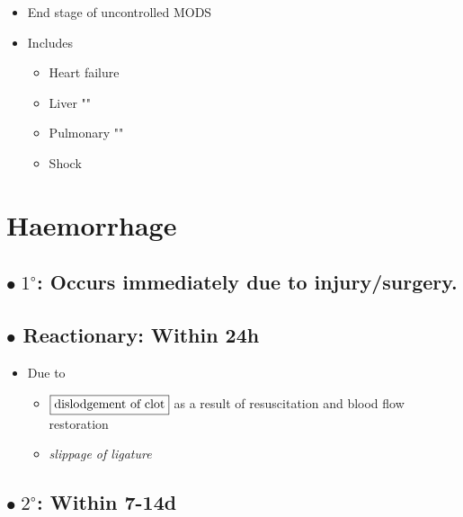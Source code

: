 \documentclass[
  12pt,
]{memoir}
\providecommand{\tightlist}{%
  \setlength{\itemsep}{0pt}\setlength{\parskip}{0pt}}
\begin{document}
\begin{itemize}
\tightlist
\item
  End stage of uncontrolled MODS
\item
  Includes

  \begin{itemize}
  \tightlist
  \item
    Heart failure
  \item
    Liver ""
  \item
    Pulmonary ""
  \item
    Shock
  \end{itemize}
\end{itemize}

\hypertarget{haemorrhage}{%
\section{Haemorrhage}\label{haemorrhage}}

\hypertarget{bullet-1circ-occurs-immediately-due-to-injurysurgery.}{%
\subsection{\texorpdfstring{\(\bullet\; 1^\circ\): Occurs immediately
due to
injury/surgery.}{\textbackslash bullet\textbackslash; 1\^{}\textbackslash circ: Occurs immediately due to injury/surgery.}}\label{bullet-1circ-occurs-immediately-due-to-injurysurgery.}}

\hypertarget{bullet-reactionary-within-24h}{%
\subsection{\texorpdfstring{\(\bullet\) Reactionary: Within
24h}{\textbackslash bullet Reactionary: Within 24h}}\label{bullet-reactionary-within-24h}}

\begin{itemize}
\tightlist
\item
  Due to

  \begin{itemize}
  \tightlist
  \item
    \(\fbox{dislodgement of clot}\) as a result of resuscitation and
    blood flow restoration
  \item
    \emph{slippage of ligature}
  \end{itemize}
\end{itemize}

\hypertarget{bullet-2circ-within-7-14d}{%
\subsection{\texorpdfstring{\(\bullet\; 2^\circ\): Within
7-14d}{\textbackslash bullet\textbackslash; 2\^{}\textbackslash circ: Within 7-14d}}\label{bullet-2circ-within-7-14d}}
\end{document}
